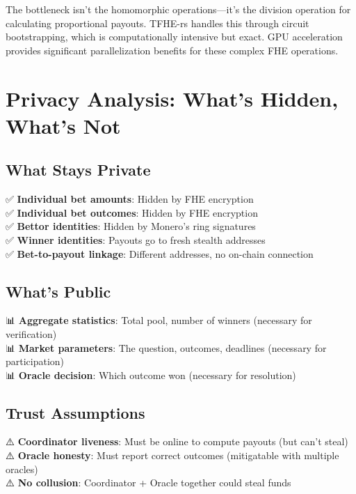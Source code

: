 \documentclass{article}
\begin{document}
The bottleneck isn't the homomorphic operations---it's the division operation for calculating proportional payouts. TFHE-rs handles this through circuit bootstrapping, which is computationally intensive but exact. GPU acceleration provides significant parallelization benefits for these complex FHE operations.

\section{Privacy Analysis: What's Hidden, What's Not}

\subsection{What Stays Private}

✅ \textbf{Individual bet amounts}: Hidden by FHE encryption\\
✅ \textbf{Individual bet outcomes}: Hidden by FHE encryption\\
✅ \textbf{Bettor identities}: Hidden by Monero's ring signatures\\
✅ \textbf{Winner identities}: Payouts go to fresh stealth addresses\\
✅ \textbf{Bet-to-payout linkage}: Different addresses, no on-chain connection

\subsection{What's Public}

📊 \textbf{Aggregate statistics}: Total pool, number of winners (necessary for verification)\\
📊 \textbf{Market parameters}: The question, outcomes, deadlines (necessary for participation)\\
📊 \textbf{Oracle decision}: Which outcome won (necessary for resolution)

\subsection{Trust Assumptions}

⚠️ \textbf{Coordinator liveness}: Must be online to compute payouts (but can't steal)\\
⚠️ \textbf{Oracle honesty}: Must report correct outcomes (mitigatable with multiple oracles)\\
⚠️ \textbf{No collusion}: Coordinator + Oracle together could steal funds
\end{document}
